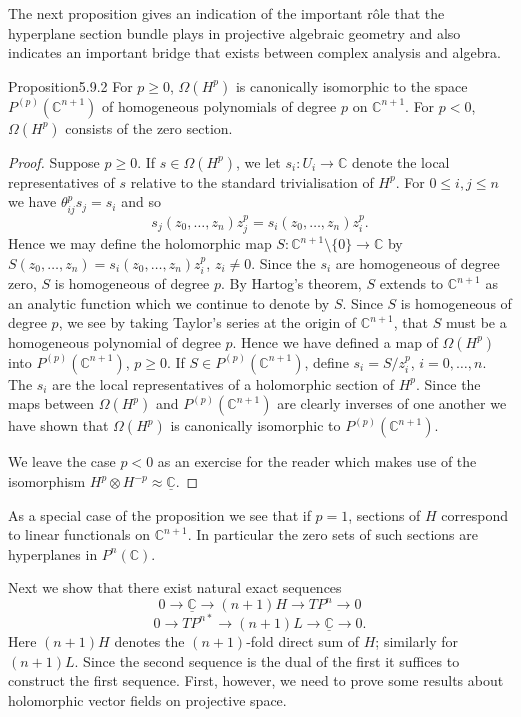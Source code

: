 The next proposition gives an indication of the important r\^ole that the hyperplane section bundle plays in projective algebraic geometry and also indicates an important bridge that exists between complex analysis and algebra.
\begin{originaltheorem}{Proposition}{5.9.2}
For $p\geq0$, $\Omega(H^p)$ is canonically isomorphic to the space $P^{(p)}(\mathbb C^{n+1})$ of homogeneous polynomials of degree $p$ on $\mathbb C^{n+1}$. For $p<0$, $\Omega(H^p)$ consists of the zero section.
\end{originaltheorem}
\begin{proof}
Suppose $p\geq0$. If $s\in\Omega(H^p)$, we let $s_i:U_i\to\mathbb C$ denote the local representatives of $s$ relative to the standard trivialisation of $H^p$. For $0\leq i,j\leq n$ we have $\theta_{ij}^ps_j=s_i$ and so
\[s_j(z_0,\ldots,z_n)z_j^p=s_i(z_0,\ldots,z_n)z_i^p.\]
Hence we may define the holomorphic map $S:\mathbb C^{n+1}\setminus\{0\}\to\mathbb C$ by $S(z_0,\ldots,z_n)=s_i(z_0,\ldots,z_n)z_i^p$, $z_i\neq0$. Since the $s_i$ are homogeneous of degree zero, $S$ is homogeneous of degree $p$. By Hartog's theorem, $S$ extends to $\mathbb C^{n+1}$ as an analytic function which we continue to denote by $S$. Since $S$ is homogeneous of degree $p$, we see by taking Taylor's series at the origin of $\mathbb C^{n+1}$, that $S$ must be a homogeneous polynomial of degree $p$. Hence we have defined a map of $\Omega(H^p)$ into $P^{(p)}(\mathbb C^{n+1})$, $p\geq0$. If $S\in P^{(p)}(\mathbb C^{n+1})$, define $s_i=S/z_i^p$, $i=0,\ldots,n$. The $s_i$ are the local representatives of a holomorphic section of $H^p$. Since the maps between $\Omega(H^p)$ and $P^{(p)}(\mathbb C^{n+1})$ are clearly inverses of one another we have shown that $\Omega(H^p)$ is canonically isomorphic to $P^{(p)}(\mathbb C^{n+1})$.

We leave the case $p<0$ as an exercise for the reader which makes use of the isomorphism $H^p\otimes H^{-p}\approx\underline{\mathbb C}$.
\end{proof}
As a special case of the proposition we see that if $p=1$, sections of $H$ correspond to linear functionals on $\mathbb C^{n+1}$. In particular the zero sets of such sections are hyperplanes in $P^n(\mathbb C)$.

Next we show that there exist natural exact sequences
\[0\to\underline{\mathbb C}\to(n+1)H\to TP^n\to0\]
\[0\to TP^{n*}\to(n+1)L\to\underline{\mathbb C}\to0.\]
Here $(n+1)H$ denotes the $(n+1)$-fold direct sum of $H$; similarly for $(n+1)L$. Since the second sequence is the dual of the first it suffices to construct the first sequence. First, however, we need to prove some results about holomorphic vector fields on projective space.

